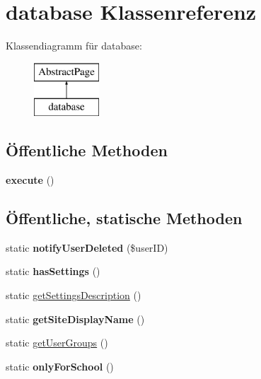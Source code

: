 \hypertarget{classdatabase}{}\section{database Klassenreferenz}
\label{classdatabase}
Klassendiagramm für database\+:\begin{figure}[H]
\begin{center}
\leavevmode
\includegraphics[height=2.000000cm]{classdatabase}
\end{center}
\end{figure}
\subsection*{Öffentliche Methoden}
\begin{DoxyCompactItemize}
\item 
\mbox{\label{classdatabase_a15412a907ee6716524cf1f613cc2db6c}} 
{\bfseries execute} ()
\end{DoxyCompactItemize}
\subsection*{Öffentliche, statische Methoden}
\begin{DoxyCompactItemize}
\item 
\mbox{\label{classdatabase_aebf54409f3fe5ac1ed08a031ffa2d562}} 
static {\bfseries notify\+User\+Deleted} (\$user\+ID)
\item 
\mbox{\label{classdatabase_a6f75532e5c19f578748903d2eee39607}} 
static {\bfseries has\+Settings} ()
\item 
static \mbox{\hyperlink{classdatabase_af4761528eebd534762e04a918ab26f70}{get\+Settings\+Description}} ()
\item 
\mbox{\label{classdatabase_afb2cf1dac55df058fa21def29325bc77}} 
static {\bfseries get\+Site\+Display\+Name} ()
\item 
static \mbox{\hyperlink{classdatabase_a9db9a8cf32d2dea7e5120ceb2b0d603d}{get\+User\+Groups}} ()
\item 
\mbox{\label{classdatabase_aad1578665541ad17c073fe4559c8d5ee}} 
static {\bfseries only\+For\+School} ()
\end{DoxyCompactItemize}
